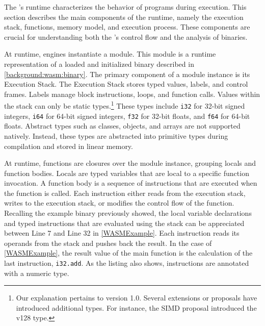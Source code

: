 \label{background:wasm:execution}

The \Wasm's runtime characterizes the behavior of \wasm programs during execution. 
This section describes the main components of the \Wasm runtime, namely the execution stack, functions, memory model, and execution process. 
These components are crucial for understanding both the \Wasm's control flow and the analysis of \Wasm binaries.


 At runtime, \Wasm engines instantiate a \Wasm module. 
This module is a runtime representation of a loaded and initialized \Wasm binary described in \autoref{background:wasm:binary}. 
The primary component of a module instance is its Execution Stack. 
The Execution Stack stores typed values, labels, and control frames. 
Labels manage block instructions, loops, and function calls. 
Values within the stack can only be static types.\footnote{
Our explanation pertains to \Wasm version 1.0. Several extensions or proposals have introduced additional types. For instance, the SIMD proposal introduced the v128 type. } 
These types include \texttt{i32} for 32-bit signed integers, \texttt{i64} for 64-bit signed integers, \texttt{f32} for 32-bit floats, and \texttt{f64} for 64-bit floats. 
Abstract types such as classes, objects, and arrays are not supported natively. 
Instead, these types are abstracted into primitive types during compilation and stored in linear memory.


At runtime, \Wasm functions are closures over the module instance, grouping locals and function bodies.
Locals are typed variables that are local to a specific function invocation.
A function body is a sequence of instructions that are executed when the function is called.
Each instruction either reads from the execution stack, writes to the execution stack, or modifies the control flow of the function.
Recalling the example \wasm binary previously showed, 
the local variable declarations and typed instructions that are evaluated using the stack can be appreciated between Line 7 and Line 32 in \autoref{WASMExample}. 
Each instruction reads its operands from the stack and pushes back the result. 
In the case of \autoref{WASMExample}, the result value of the main function is the calculation of the last instruction, \texttt{i32.add}. 
As the listing also shows, instructions are annotated with a numeric type.


